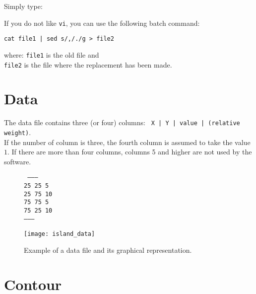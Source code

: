 Simply type:

\etips


\btips

If you do not like \texttt{vi}, you can use the following batch command:
\begin{verbatim}
cat file1 | sed s/,/./g > file2
\end{verbatim}

where: \texttt{file1} is the old file and \\
\hphantom{where:} \texttt{file2} is the file where the replacement has been made.
\etips




\section{Data}

The data file contains three (or four) columns: \texttt{ X | Y | value | (relative weight)}.\\
If the number of column is three, the fourth column is assumed to take the value $1$. If there are more than four columns, columns 5 and higher are not used by the software.%

\begin{figure}[H]
\centering

\parbox{.5\textwidth}{
\begin{footnotesize}
\tt
--------\\
25 25	5\\
25 75 10\\
75 75 5\\
75 25 10\\
--------
\end{footnotesize}
}\parbox{.5\textwidth}{
\texttt{[image: island\_data]}
}
\caption{Example of a data file and its graphical representation.}
\end{figure}


\section{Contour\label{contourdiva}}

